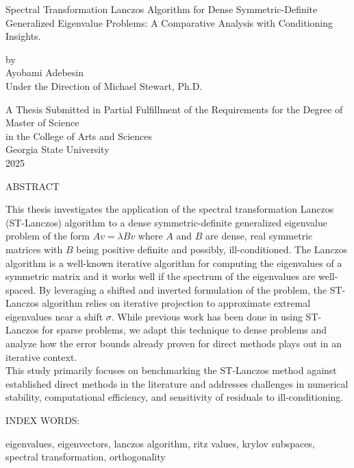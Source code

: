 \pagestyle{empty}
\begin{center}
Spectral Transformation Lanczos Algorithm for Dense Symmetric-Definite Generalized Eigenvalue Problems: A Comparative Analysis with Conditioning Insights.

\vspace{.9in}
by\\
\vspace{.9in}
Ayobami Adebesin\\
\vspace{.9in}
Under the Direction of Michael Stewart, Ph.D. \\
\vspace{2in}

A Thesis Submitted in Partial Fulfillment of the Requirements for the Degree of\\  %
\vspace{.2in}
Master of Science \\
\vspace{.2in}
in the College of Arts and Sciences \\
\vspace{.2in}
Georgia State University \\
\vspace{.2in}
2025
\pagebreak 



ABSTRACT\\
\bigskip
\end{center}

\begin{flushleft}
	\justify
	This thesis investigates the application of the spectral transformation Lanczos (ST-Lanczos) algorithm to a dense symmetric-definite generalized eigenvalue problem of the form $Av = \lambda Bv$ where $A$ and $B$ are dense, real symmetric matrices with $B$ being positive definite and possibly, ill-conditioned. The Lanczos algorithm is a well-known iterative algorithm for computing the eigenvalues of a symmetric matrix and it works well if the spectrum of the eigenvalues are well-spaced. By leveraging a shifted and inverted formulation of the problem, the ST-Lanczos algorithm relies on iterative projection to approximate extremal eigenvalues near a shift $\sigma$. While previous work has been done in using ST-Lanczos for sparse problems, we adapt this technique to dense problems and analyze how the error bounds already proven for direct methods plays out in an iterative context.\\[10pt]
	This study primarily focuses on benchmarking the ST-Lanczos method against established direct methods in the literature and addresses challenges in numerical stability, computational efficiency, and sensitivity of residuals to ill-conditioning.
\end{flushleft} 
\begin{singlespace}
\vspace{0.5in}
\noindent INDEX WORDS:
\hspace{0.2in}
\parbox[t]{4.5in}{
eigenvalues, eigenvectors, lanczos algorithm, ritz values, krylov subspaces, spectral transformation, orthogonality}
\end{singlespace} 
